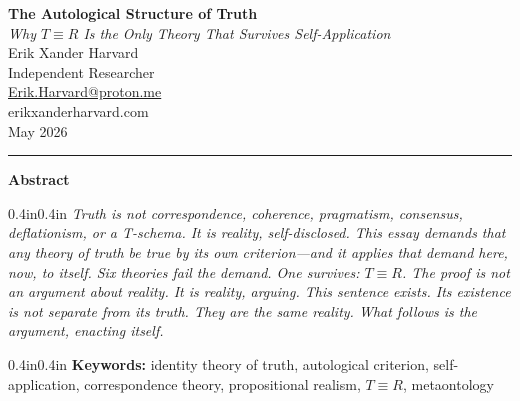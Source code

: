 \documentclass[11pt, oneside]{article}
\begin{document}

\thispagestyle{plain}
\vspace*{0.4in}

\begin{center}
{\LARGE\bfseries The Autological Structure of Truth}\\[0.5em]
{\large\itshape Why $T \equiv R$ Is the Only Theory That Survives
Self-Application}\\[1.6em]
\textcolor{LogosGray}{Erik Xander Harvard}\\[0.2em]
\textcolor{LogosGray}{\small Independent Researcher}\\[0.2em]
\textcolor{LogosGray}{\small \href{mailto:Erik.Harvard@proton.me}{Erik.Harvard@proton.me}}\\[0.2em]
\textcolor{LogosGray}{\small erikxanderharvard.com}\\[0.2em]
\textcolor{LogosGray}{\small May 2026}\\[1.4em]
{\color{LogosGray}\rule{0.45\textwidth}{0.4pt}}
\end{center}

\vspace{1em}

\begin{center}{\small\bfseries Abstract}\end{center}

\begin{adjustwidth}{0.4in}{0.4in}
\small\itshape
Truth is not correspondence, coherence, pragmatism, consensus,
deflationism, or a T-schema. It is reality, self-disclosed. This essay
demands that any theory of truth be true by its own criterion---and it
applies that demand here, now, to itself. Six theories fail the demand.
One survives: $T \equiv R$. The proof is not an argument about reality.
It is reality, arguing. This sentence exists. Its existence is not
separate from its truth. They are the same reality. What follows is the
argument, enacting itself.
\end{adjustwidth}

\vspace{0.8em}

\begin{adjustwidth}{0.4in}{0.4in}
\small\noindent\textbf{Keywords:} identity theory of truth, autological criterion, self-application, correspondence theory, propositional realism, $T \equiv R$, metaontology
\end{adjustwidth}
\end{document}
